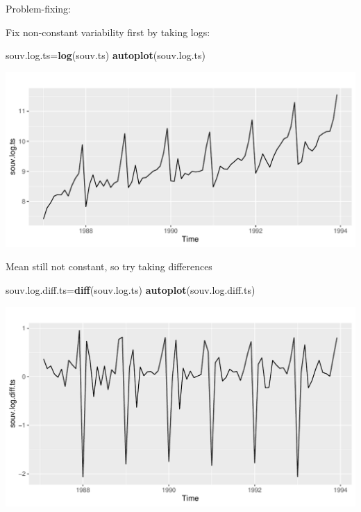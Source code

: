 \documentclass[ignorenonframetext,]{beamer}
\newenvironment{Shaded}{\begin{snugshade}}{\end{snugshade}}
\newcommand{\KeywordTok}[1]{\textcolor[rgb]{0.13,0.29,0.53}{\textbf{#1}}}
\newcommand{\NormalTok}[1]{#1}
\begin{document}
\begin{frame}[fragile]{Problem-fixing:}
\protect\hypertarget{problem-fixing}{}

Fix non-constant variability first by taking logs:

\begin{Shaded}
\begin{Highlighting}[]
\NormalTok{souv.log.ts=}\KeywordTok{log}\NormalTok{(souv.ts)}
\KeywordTok{autoplot}\NormalTok{(souv.log.ts)}
\end{Highlighting}
\end{Shaded}

\includegraphics{figure/unnamed-chunk-541-1.pdf}

\end{frame}

\begin{frame}[fragile]{Mean still not constant, so try taking
differences}
\protect\hypertarget{mean-still-not-constant-so-try-taking-differences}{}

\begin{Shaded}
\begin{Highlighting}[]
\NormalTok{souv.log.diff.ts=}\KeywordTok{diff}\NormalTok{(souv.log.ts)}
\KeywordTok{autoplot}\NormalTok{(souv.log.diff.ts)}
\end{Highlighting}
\end{Shaded}

\includegraphics{figure/unnamed-chunk-542-1.pdf}

\end{frame}
\end{document}
